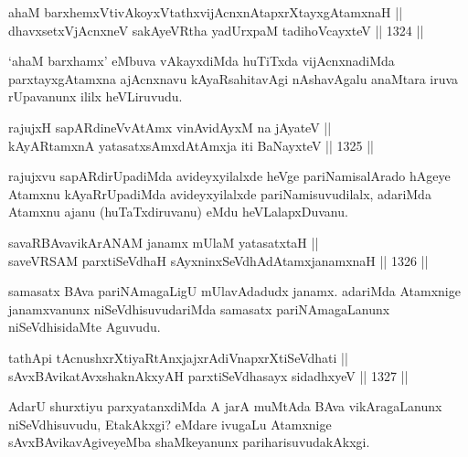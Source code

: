 \begin{shl}
ahaM barxhemxVtivAkoyxVtathxvijAcnxnAtapxrXtayxgAtamxnaH ||  \\
dhavxsetxV\s jAcnxneV sakAyeVR\s tha yadUrxpaM tadihoVcayxteV \hfill || 1324 ||  
\end{shl}

\begin{artha}
`ahaM barxhamx' eMbuva vAkayxdiMda huTiTxda vijAcnxnadiMda parxtayxgAtamxna ajAcnxnavu kAyaRsahitavAgi nAshavAgalu anaMtara iruva rUpavanunx ililx heVLiruvudu.
\end{artha}

\begin{shl}
rajujxH sapARdineVvA\s \s tAmx vinA\s vidAyxM na jAyateV || \\
kAyARtamxnA yatasatxsAmxdAtAmx\s ja iti BaNayxteV \hfill || 1325 ||  
\end{shl}

\begin{artha}
rajujxvu sapARdirUpadiMda avideyxyilalxde heVge pariNamisalArado hAgeye Atamxnu kAyaRrUpadiMda avideyxyilalxde pariNamisuvudilalx, adariMda Atamxnu ajanu (huTaTxdiruvanu) eMdu heVLalapxDuvanu.
\end{artha}


\begin{shl}
savaRBAvavikArANAM janamx mUlaM yatasatxtaH || \\
saveVRSAM parxtiSeVdhaH sAyxninxSeVdhAdAtamxjanamxnaH \hfill || 1326 ||  
\end{shl}

\begin{artha}
samasatx BAva pariNAmagaLigU mUlavAdadudx janamx. adariMda Atamxnige janamxvanunx niSeVdhisuvudariMda samasatx pariNAmagaLanunx niSeVdhisidaMte Aguvudu.
\end{artha}


\begin{shl}
tathA\s pi tAcnushxrXtiyaRtAnxjajxrAdiVnapxrXtiSeVdhati || \\
sAvxBAvikatAvxshaknAkxyAH parxtiSeVdhasayx sidadhxyeV \hfill || 1327 ||  
\end{shl}

\begin{artha}
AdarU shurxtiyu parxyatanxdiMda A jarA muMtAda BAva vikAragaLanunx niSeVdhisuvudu, EtakAkxgi? eMdare ivugaLu Atamxnige sAvxBAvikavAgiveyeMba shaMkeyanunx pariharisuvudakAkxgi.
\end{artha}

